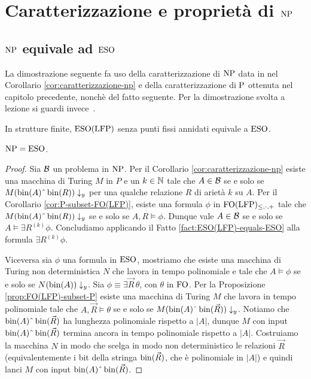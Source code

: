 \chapter{Caratterizzazione e proprietà di \texorpdfstring{$\NP$}{NP}}

\section{\texorpdfstring{$\NP$}{NP} equivale ad \texorpdfstring{$\ESO$}{ESO}}

La dimostrazione seguente fa uso della caratterizzazione di $\NP$ data in
nel Corollario \ref{cor:caratterizzazione-np} e della caratterizzazione di $\P$
ottenuta nel capitolo precedente, nonchè del fatto seguente. Per la dimostrazione
svolta a lezione si guardi invece~\cite[7.2]{immerman1999descriptive}.
\begin{fatto}
\label{fact:ESO(LFP)-equals-ESO}
 In strutture finite, $\ESO(\LFP)$ senza punti fissi annidati equivale a $\ESO$.
\end{fatto}

\begin{teorema}[Fagin]
  \label{thm:np-eso}
  $\NP = \ESO$.
\end{teorema}
\begin{proof}
 Sia $\B$ un problema in $\NP$. Per il Corollario \ref{cor:caratterizzazione-np}
 esiste una macchina di Turing $M$ in $P$ e un $k \in \N$ tale che
 $A \in \B$ se e solo se $M(\bin(A)\string^\bin(R))\downarrow_y$ per una qualche
 relazione $R$ di arietà $k$ su $A$.
 Per il Corollario \ref{cor:P-subset-FO(LFP)}, esiste una formula $\phi$
 in $\FOLFP$ tale che $M(\bin(A)\string^\bin(R))\downarrow_y$ se e solo se
 $A,R \models \phi$. Dunque vale $A \in \B$ se e solo se
 $A \models \exists R^{(k)} \phi$. Concludiamo applicando il 
 Fatto \ref{fact:ESO(LFP)-equals-ESO} alla formula $\exists R^{(k)} \phi$.
 
 Viceversa sia $\phi$ una formula in $\ESO$, mostriamo che esiste una macchina
 di Turing non deterministica $N$ che lavora in tempo polinomiale e
 tale che $A \models \phi$ se e solo se $N(\bin(A))\downarrow_y$.
 Sia $\phi \equiv \exists \vec{R}\,\theta$, con $\theta$ in $\FO$.
 Per la Proposizione \ref{prop:FO(LFP)-subset-P} esiste una macchina di Turing
 $M$ che lavora in tempo polinomiale tale che $A,\vec{R} \models \theta$
 se e solo se $M(\bin(A)\string^\bin(\vec{R}))\downarrow_y$.
 Notiamo che $\bin(A)\string^\bin(\vec{R})$ ha lunghezza polinomiale
 rispetto a $|A|$, dunque $M$ con input $\bin(A)\string^\bin(\vec{R})$ termina ancora
 in tempo polinomiale rispetto a $|A|$. Costruiamo la macchina $N$
 in modo che scelga
 in modo non deterministico le relazioni $\vec{R}$ (equivalentemente i bit
 della stringa $\bin(\vec{R})$, che è polinomiale in $|A|$) e quindi lanci
 $M$ con input $\bin(A)\string^\bin(\vec{R})$.
\end{proof}


